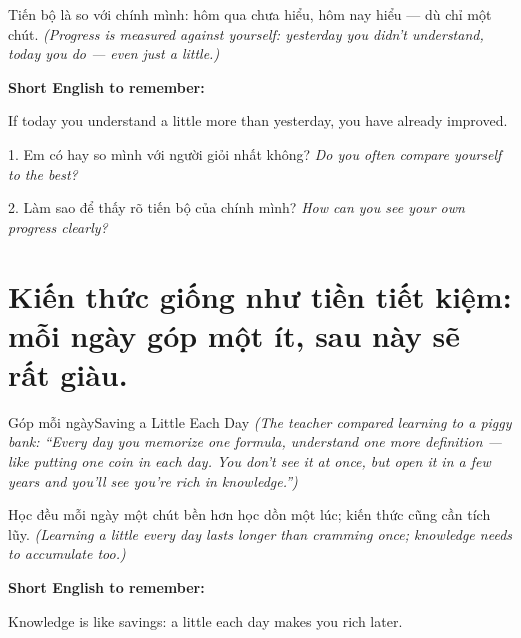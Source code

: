 \begin{baihoc}
Tiến bộ là so với chính mình: hôm qua chưa hiểu, hôm nay hiểu — dù chỉ một chút.
\textit{(Progress is measured against yourself: yesterday you didn't understand, today you do — even just a little.)}
\end{baihoc}

\begin{ghinhoanh}
\textbf{Short English to remember:}

If today you understand a little more than yesterday, you have already improved.

\end{ghinhoanh}

\begin{tuhocnhanh}
1. Em có hay so mình với người giỏi nhất không? \textit{Do you often compare yourself to the best?}

2. Làm sao để thấy rõ tiến bộ của chính mình? \textit{How can you see your own progress clearly?}
\end{tuhocnhanh}
\ngancach

\section{Kiến thức giống như tiền tiết kiệm: mỗi ngày góp một ít, sau này sẽ rất giàu.}
\begin{truyen}{Góp mỗi ngày}{Saving a Little Each Day}
\textit{(The teacher compared learning to a piggy bank: ``Every day you memorize one formula, understand one more definition — like putting one coin in each day. You don't see it at once, but open it in a few years and you'll see you're rich in knowledge.'')}
\end{truyen}

\begin{baihoc}
Học đều mỗi ngày một chút bền hơn học dồn một lúc; kiến thức cũng cần tích lũy.
\textit{(Learning a little every day lasts longer than cramming once; knowledge needs to accumulate too.)}
\end{baihoc}

\begin{ghinhoanh}
\textbf{Short English to remember:}

Knowledge is like savings: a little each day makes you rich later.

\end{ghinhoanh}

